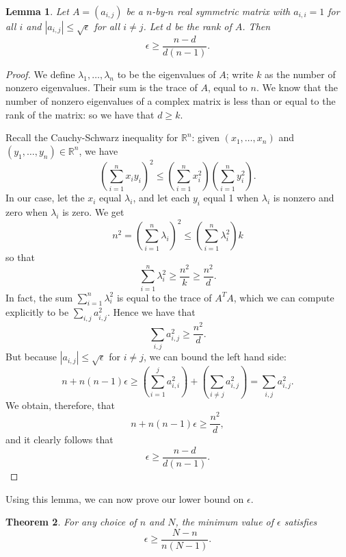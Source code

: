 \documentclass[11pt,letterpaper,twoside,english]{article}
\theoremstyle{theorem}
\newtheorem{theorem}{Theorem}[section]
\newtheorem{lemma}[theorem]{Lemma}
\theoremstyle{remark}
\begin{document}
\begin{lemma}
Let $A=(a_{i,j})$ be a $n$-by-$n$ real symmetric matrix with $a_{i,i}=1$ for all $i$ and $|a_{i,j}|\leq \sqrt{\epsilon}$ for all $i\neq j$. Let $d$ be the rank of $A$. Then
\[\epsilon\geq \frac{n-d}{d(n-1)}.\]
\end{lemma}
\begin{proof}
We define $\lambda_1,\ldots, \lambda_n$ to be the eigenvalues of $A$; write $k$ as the number of nonzero eigenvalues. Their sum is the trace of $A$, equal to $n$. We know that the number of nonzero eigenvalues of a complex matrix is less than or equal to the rank of the matrix: so we have that $d\geq k$.

Recall the Cauchy-Schwarz inequality for $\mathbb R^n$: given $(x_1,\ldots, x_n)$ and $(y_1,\ldots, y_n)\in \mathbb R^n$, we have
\[\left(\sum_{i=1}^nx_iy_i\right)^2\leq \left(\sum_{i=1}^n x_i^2\right)\left(\sum_{i=1}^ny_i^2\right).\]
In our case, let the $x_i$ equal $\lambda_i$, and let each $y_i$ equal 1 when $\lambda_i$ is nonzero and zero when $\lambda_i$ is zero. We get
\[n^2=\left(\sum_{i=1}^n \lambda_i\right)^2\leq \left(\sum_{i=1}^n \lambda_i^2\right) k\]
so that
\[\sum_{i=1}^n \lambda_i^2\geq\frac{n^2}{k}\geq \frac{n^2}{d}.\]
In fact, the sum $\sum_{i=1}^n \lambda_i^2$ is equal to the trace of $A^TA$, which we can compute explicitly to be $\sum_{i,j}a_{i,j}^2$. Hence we have that
\[\sum_{i,j}a_{i,j}^2\geq \frac{n^2}{d}.\]
But because $|a_{i,j}|\leq \sqrt\epsilon$ for $i\neq j$, we can bound the left hand side:
\[n+n(n-1)\epsilon\geq \left(\sum_{i=1}^j a_{i,i}^2\right)+\left(\sum_{i\neq j}a_{i,j}^2\right)=\sum_{i,j}a_{i,j}^2.\]
We obtain, therefore, that
\[n+n(n-1)\epsilon\geq \frac{n^2}{d},\]
and it clearly follows that
\[\epsilon\geq \frac{n-d}{d(n-1)}.\]
\end{proof}
Using this lemma, we can now prove our lower bound on $\epsilon$.
\begin{theorem}
\label{lower_bound}
For any choice of $n$ and $N$, the minimum value of $\epsilon$ satisfies
\[\epsilon\geq \frac{N-n}{n(N-1)}.\]
\end{theorem}
\end{document}
